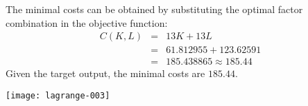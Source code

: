\begin{solution}
 The minimal costs can be obtained by substituting the optimal factor combination in the objective function:
 \begin{eqnarray*}
 C(K, L) & = & 13 K + 13 L\\
         & = & 61.812955 + 123.62591 \\
         & = & 185.438865 \approx 185.44
 \end{eqnarray*}
Given the target output, the minimal costs are $185.44$.

\texttt{[image: lagrange-003]}
\end{solution}


